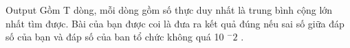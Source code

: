 Output
Gồm T dòng, mỗi dòng gồm số thực duy nhất là trung bình cộng lớn nhất tìm được. Bài của bạn được coi là đưa ra kết quả đúng nếu sai số giữa đáp số của bạn và đáp số của ban tổ chức không quá 10   $^    -2   $   .